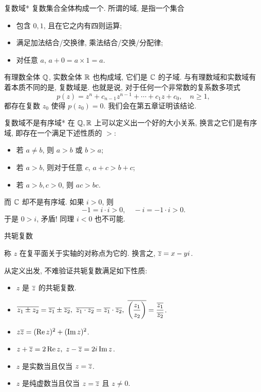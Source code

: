 \begin{frame}{复数域*}
\onslide<+->复数集合全体构成一个.
\onslide<+->所谓的域, 是指一个集合
\begin{itemize}
\item 包含 $0,1$, 且在它之内有四则运算;
\item 满足加法结合/交换律, 乘法结合/交换/分配律;
\item 对任意 $a$, $a+0=a\times 1=a$.
\end{itemize}
\onslide<+->有理数全体 ${\mathbb{Q}}$, 实数全体 ${\mathbb{R}}$ 也构成域, 它们是 ${\mathbb{C}}$ 的子域.
\onslide<+->与有理数域和实数域有着本质不同的是, 复数域是.
\onslide<+->也就是说, 对于任何一个非常数的复系数多项式
	\[p(z)=z^n+c_{n-1}z^{n-1}+\cdots+c_1z+c_0,\quad n\ge 1,\]
\onslide<+->都存在复数 $z_0$ 使得 $p(z_0)=0$.
\onslide<+->我们会在第五章证明该结论.
\end{frame}


\begin{frame}{复数域不是有序域*}
\onslide<+->在 ${\mathbb{Q}},{\mathbb{R}}$ 上可以定义出一个好的大小关系,
\onslide<+->换言之它们是有序域, 即存在一个满足下述性质的 $>$:
\begin{itemize}
\item 若 $a\neq b$, 则 $a>b$ 或 $b>a$;
\item 若 $a>b$, 则对于任意 $c$, $a+c>b+c$;
\item 若 $a>b,c>0$, 则 $ac>bc$.
\end{itemize}
\onslide<+->而 ${\mathbb{C}}$ 却不是有序域.
\onslide<+->如果 $i>0$, 则
	\[-1=i\cdot i>0,\quad -i=-1\cdot i>0.\]
\onslide<+->于是 $0>i$, 矛盾! 同理 $i<0$ 也不可能.
\end{frame}


\begin{frame}{共轭复数}
\onslide<+->
\begin{definition}
称 $z$ 在复平面关于实轴的对称点为它的.
换言之, $\overline z=x-yi$.
\end{definition}
\onslide<+->从定义出发, 不难验证共轭复数满足如下性质:
\onslide<+->
\begin{conclusion}[共轭复数性质汇总]
\begin{itemize}
\item $z$ 是 $\overline z$ 的共轭复数.
\item $\ov{z_1\pm z_2}=\ov{z_1}\pm\ov{z_2},\ 
\ov{z_1\cdot z_2}=\ov{z_1}\cdot\ov{z_2},\ 
\ov{\left(\dfrac{z_1}{z_2}\right)}=\dfrac{\ov{z_1}}{\ov{z_2}}$.
\item $z\overline{z}=(\operatorname{Re} z)^2+(\operatorname{Im} z)^2$.
\item $z+\overline z=2\operatorname{Re} z,\ z-\overline z=2i\operatorname{Im} z$.
\item $z$ 是实数当且仅当 $z=\overline z$.
\item $z$ 是纯虚数当且仅当 $z=\overline z$ 且 $z\neq 0$.
\end{itemize}
\end{conclusion}
\end{frame}



